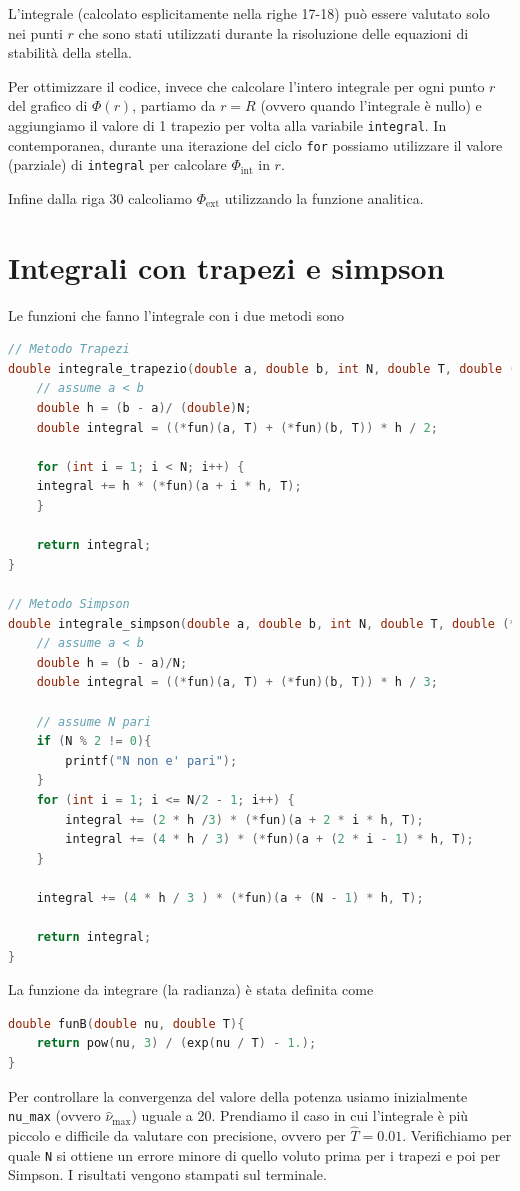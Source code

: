 \documentclass[a4paper, titlepage]{article}
\begin{document}
L'integrale (calcolato esplicitamente nella righe 17-18) può essere valutato
solo nei punti $r$ che sono stati utilizzati durante la risoluzione delle
equazioni di stabilità della stella.

Per ottimizzare il codice, invece che calcolare l'intero integrale per ogni
punto $r$ del grafico di $\Phi(r)$, partiamo da $r = R$ (ovvero quando
l'integrale è nullo) e aggiungiamo il valore di 1 trapezio per volta alla
variabile \texttt{integral}. In contemporanea, durante una iterazione del ciclo
\texttt{for} possiamo utilizzare il valore (parziale) di \texttt{integral} per
calcolare $\Phi_\text{int}$ in $r$.

Infine dalla riga 30 calcoliamo $\Phi_\text{ext}$ utilizzando la funzione
analitica.


\section{Integrali con trapezi e simpson} \label{ap:integrali}

Le funzioni che fanno l'integrale con i due metodi sono

\begin{lstlisting}[language=C]
// Metodo Trapezi
double integrale_trapezio(double a, double b, int N, double T, double (*fun)(double, double)){
    // assume a < b
    double h = (b - a)/ (double)N;
    double integral = ((*fun)(a, T) + (*fun)(b, T)) * h / 2;

    for (int i = 1; i < N; i++) {
    integral += h * (*fun)(a + i * h, T);
    }

    return integral;
}

// Metodo Simpson
double integrale_simpson(double a, double b, int N, double T, double (*fun)(double, double)){
    // assume a < b
    double h = (b - a)/N;
    double integral = ((*fun)(a, T) + (*fun)(b, T)) * h / 3;

    // assume N pari
    if (N % 2 != 0){
        printf("N non e' pari");
    }
    for (int i = 1; i <= N/2 - 1; i++) {
        integral += (2 * h /3) * (*fun)(a + 2 * i * h, T);
        integral += (4 * h / 3) * (*fun)(a + (2 * i - 1) * h, T);
    }

    integral += (4 * h / 3 ) * (*fun)(a + (N - 1) * h, T);

    return integral;
}
\end{lstlisting}

La funzione da integrare (la radianza) è stata definita come
\begin{lstlisting}[language=C]
double funB(double nu, double T){
    return pow(nu, 3) / (exp(nu / T) - 1.);
}
\end{lstlisting}
Per controllare la convergenza del valore della potenza usiamo inizialmente
\texttt{nu\_max} (ovvero $\hat \nu_\text{max}$) uguale a 20.
Prendiamo il caso in cui l'integrale è più piccolo e difficile da valutare con
precisione, ovvero per $\hat T = 0.01$.
Verifichiamo per quale \texttt{N} si ottiene un errore minore di quello voluto
prima per i trapezi e poi per Simpson.
I risultati vengono stampati sul terminale.
\end{document}
